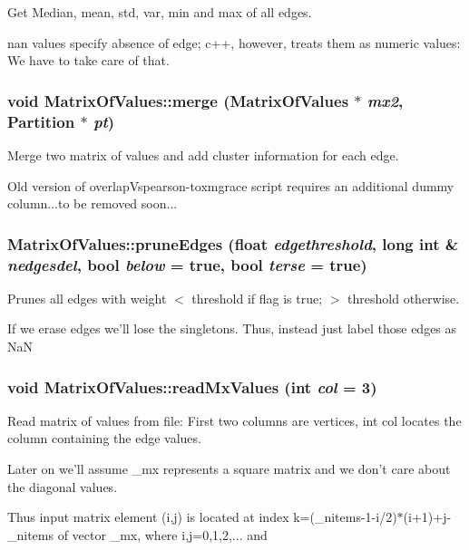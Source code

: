 Get Median, mean, std, var, min and max of all edges. 

nan values specify absence of edge; c++, however, treats them as numeric values: We have to take care of that. 
\subsubsection{\setlength{\rightskip}{0pt plus 5cm}void Matrix\-Of\-Values::merge ({\bf Matrix\-Of\-Values} $\ast$ {\em mx2}, Partition $\ast$ {\em pt})}\label{classMatrixOfValues_a19}


Merge two matrix of values and add cluster information for each edge. 

Old version of overlap\-Vspearson-toxmgrace script requires an additional dummy column...to be removed soon... 
\subsubsection{ Matrix\-Of\-Values::prune\-Edges (float {\em edgethreshold}, long int \& {\em nedgesdel}, bool {\em below} = true, bool {\em terse} = true)}\label{classMatrixOfValues_a8}


Prunes all edges with weight $<$ threshold if flag is true; $>$ threshold otherwise. 

If we erase edges we'll lose the singletons. Thus, instead just label those edges as Na\-N 
\subsubsection{\setlength{\rightskip}{0pt plus 5cm}void Matrix\-Of\-Values::read\-Mx\-Values (int {\em col} = 3)}\label{classMatrixOfValues_a13}


Read matrix of values from file: First two columns are vertices, int col locates the column containing the edge values. 

Later on we'll assume \_\-mx represents a square matrix and we don't care about the diagonal values. 

Thus input matrix element (i,j) is located at index k=(\_\-nitems-1-i/2)$\ast$(i+1)+j-\_\-nitems of vector \_\-mx, where i,j=0,1,2,... and 
